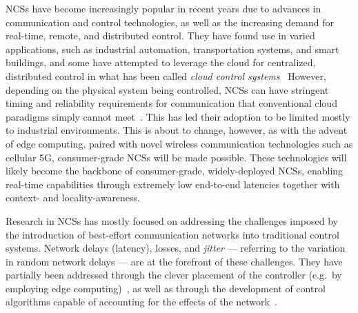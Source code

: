 \glspl{NCS} have become increasingly popular in recent years due to advances in communication and control technologies, as well as the increasing demand for real-time, remote, and distributed control.
They have found use in varied applications, such as industrial automation, transportation systems, and smart buildings, and some have attempted to leverage the cloud for centralized, distributed control in what has been called \emph{cloud control systems}~\cite{xia2015cloud}
However, depending on the physical system being controlled, \glspl{NCS} can have stringent timing and reliability requirements for communication that conventional cloud paradigms simply cannot meet~\cite{wan2020efficient}.
This has led their adoption to be limited mostly to industrial environments.
This is about to change, however, as with the advent of edge computing, paired with novel wireless communication technologies such as cellular 5G, consumer-grade \glspl{NCS} will be made possible.
These technologies will likely become the backbone of consumer-grade, widely-deployed \glspl{NCS}, enabling real-time capabilities through extremely low end-to-end latencies together with context- and locality-awareness.

\medskip
Research in \glspl{NCS} has mostly focused on addressing the challenges imposed by the introduction of best-effort communication networks into traditional control systems.
Network delays (latency), losses, and \emph{jitter} --- referring to the variation in random network delays --- are at the forefront of these challenges.
They have partially been addressed through the clever placement of the controller (e.g.\ by employing edge computing)~\cite{sasaki2017layered,sasaki2016vehicle}, as well as through the development of control algorithms capable of accounting for the effects of the network~\cite{zhang2013network}.



